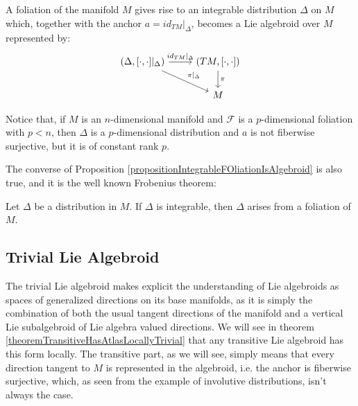 \begin{proposition}\label{propositionIntegrableFOliationIsAlgebroid}
A foliation of the manifold $M$ gives rise to an integrable distribution $\Delta$ on $M$ which, together with the anchor $a = id_{TM}|_\Delta$, becomes a Lie algebroid over $M$ represented by:
\begin{equation*}
    \begin{tikzcd}
    (\Delta, [\cdot, \cdot]|_{\Delta}) \arrow{r}{id_{TM}|_\Delta} \arrow{dr}{\pi|_\Delta} & (TM, [\cdot, \cdot]) \arrow{d}{\pi}\\
    & M
    \end{tikzcd}
\end{equation*}
\end{proposition}
Notice that, if $M$ is an $n$-dimensional manifold and $\mathcal F$ is a $p$-dimensional foliation with $p < n$, then $\Delta$ is a $p$-dimensional distribution and $a$ is not fiberwise surjective, but it is of constant rank $p$.

The converse of Proposition \ref{propositionIntegrableFOliationIsAlgebroid} is also true, and it is the well known Frobenius theorem:

\begin{proposition}
Let $\Delta$ be a distribution in $M$. If $\Delta$ is integrable, then $\Delta$ arises from a foliation of $M$.
\end{proposition}



\subsection{Trivial Lie Algebroid}\label{exampleSubSectionTLA}

The trivial Lie algebroid makes explicit the understanding of Lie algebroids as spaces of generalized directions on its base manifolds, as it is simply the combination of both the usual tangent directions of the manifold and a vertical Lie subalgebroid of Lie algebra valued directions. We will see in theorem \ref{theoremTransitiveHasAtlasLocallyTrivial} that any transitive Lie algebroid has this form locally. The transitive part, as we will see, simply means that every direction tangent to $M$ is represented in the algebroid, i.e. the anchor is fiberwise surjective, which, as seen from the example of involutive distributions, isn't always the case.


